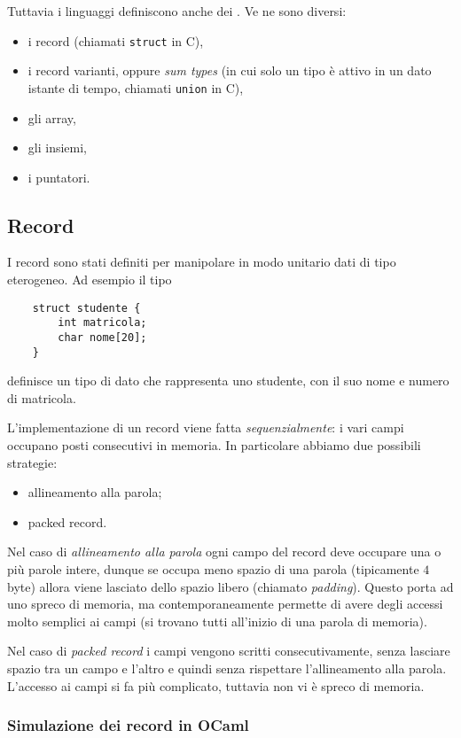Tuttavia i linguaggi definiscono anche dei . Ve ne sono diversi:
\begin{itemize}
    \item i record (chiamati \texttt{struct} in C),
    \item i record varianti, oppure \emph{sum types} (in cui solo un tipo è attivo in un dato istante di tempo, chiamati \texttt{union} in C),
    \item gli array,
    \item gli insiemi,
    \item i puntatori.
\end{itemize}

\subsection*{Record}

I record sono stati definiti per manipolare in modo unitario dati di tipo eterogeneo. Ad esempio il tipo
\begin{verbatim}
    struct studente {
        int matricola;
        char nome[20];
    }
\end{verbatim}
definisce un tipo di dato che rappresenta uno studente, con il suo nome e numero di matricola.

L'implementazione di un record viene fatta \emph{sequenzialmente}: i vari campi occupano posti consecutivi in memoria. In particolare abbiamo due possibili strategie:
\begin{itemize}
    \item allineamento alla parola;
    \item packed record.
\end{itemize}

Nel caso di \emph{allineamento alla parola} ogni campo del record deve occupare una o più parole intere, dunque se occupa meno spazio di una parola (tipicamente $4$ byte) allora viene lasciato dello spazio libero (chiamato \emph{padding}). Questo porta ad uno spreco di memoria, ma contemporaneamente permette di avere degli accessi molto semplici ai campi (si trovano tutti all'inizio di una parola di memoria).

Nel caso di \emph{packed record} i campi vengono scritti consecutivamente, senza lasciare spazio tra un campo e l'altro e quindi senza rispettare l'allineamento alla parola. L'accesso ai campi si fa più complicato, tuttavia non vi è spreco di memoria.

\subsubsection*{Simulazione dei record in OCaml}

